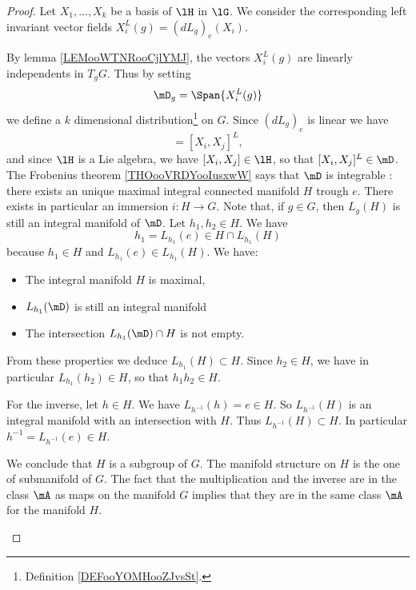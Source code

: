 \begin{proof}
	Let \( X_1,\ldots, X_k\) be a basis of \( \lH\) in \( \lG\). We consider the corresponding left invariant vector fields \( X_i^L(g)=(dL_g)_e(X_i)\).
	\begin{subproof}
		\spitem[A distribution]
		By lemma \ref{LEMooWTNRooCjlYMJ}, the vectors \( X_i^L(g)\) are linearly independents in \( T_gG\). Thus by setting
		\begin{equation}
			\mD_g=\Span\{ X_i^L(g) \}
		\end{equation}
		we define a \( k\) dimensional distribution\footnote{Definition \ref{DEFooYOMHooZJvsSt}.} on \( G\).
		\spitem[Involutive]
		Since \( (dL_g)_e\) is linear we have
		\begin{equation}
			[X_i^L,X_j^L]=[X_i,X_j]^L,
		\end{equation}
		and since \( \lH\) is a Lie algebra, we have \( [X_i,X_j]\in \lH\), so that \( [X_i,X_j]^L\in\mD\).
		\spitem[Frobenius]
		The Frobenius theorem \ref{THOooVRDYooIusxwW} says that \( \mD\) is integrable : there exists an unique maximal integral connected manifold \( H\) trough \( e\). There exists in particular an immersion \( i\colon H\to G\).
		\spitem[\( H\) is a group]
		Note that, if \( g\in G\), then \( L_g(H)\) is still an integral manifold of \( \mD\). Let \( h_1,h_2\in H\). We have
		\begin{equation}
			h_1=L_{h_1}(e)\in H\cap L_{h_1}(H)
		\end{equation}
		because \( h_1\in H\) and \( L_{h_1}(e)\in L_{h_1}(H)\). We have:
		\begin{itemize}
			\item
			      The integral manifold \( H\) is maximal,
			\item
			      \( L_{h_1}(\mD)\) is still an integral manifold
			\item
			      The intersection \( L_{h_1}(\mD)\cap H\) is not empty.
		\end{itemize}
		From these properties we deduce \( L_{h_1}(H)\subset H\). Since \( h_2\in H\), we have in particular \( L_{h_1}(h_2)\in H\), so that \( h_1h_2\in H\).

		For the inverse, let \( h\in H\). We have \( L_{h^{-1}}(h)=e\in H\). So \( L_{h^{-1}}(H)\) is an integral manifold with an intersection with \( H\). Thus \( L_{h^{-1}}(H)\subset H\). In particular \( h^{-1}=L_{h^{-1}}(e)\in H\).

		We conclude that \( H\) is a subgroup of \( G\).
		The manifold structure on \( H\) is the one of submanifold of \( G\). The fact that the multiplication and the inverse are in the class \( \mA\) as maps on the manifold \( G\) implies that they are in the same class \( \mA\) for the manifold \( H\).


\end{subproof}
\end{proof}
